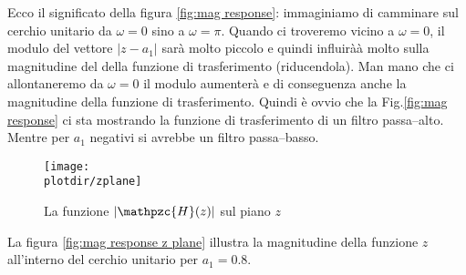 Ecco il significato della figura \ref{fig:mag response}: immaginiamo di
camminare sul cerchio unitario da $\omega = 0$ sino a $\omega = \pi$.
Quando ci troveremo vicino a $\omega = 0$, il modulo del vettore $|z - a_1|$
sar\`a molto piccolo e quindi influir\`aà molto sulla magnitudine del 
della funzione di trasferimento (riducendola). Man mano che ci allontaneremo
da $\omega = 0$ il modulo aumenter\`a e di conseguenza anche la magnitudine
della funzione di trasferimento. Quindi \`e ovvio che la Fig.\vref{fig:mag
response} ci sta mostrando la funzione di trasferimento di un filtro
passa--alto. Mentre per $a_1$ negativi si avrebbe un filtro passa--basso.
\begin{figure}[htp]
\begin{center}
				\texttt{[image: \\plotdir/zplane]}
				\caption{La funzione $|\mathpzc{H}(z)|$ sul piano $z$\label{fig:mag response z plane}}
\end{center}
\end{figure}

La figura \vref{fig:mag response z plane} illustra la magnitudine della
funzione $z$ all'interno del cerchio unitario per $a_1 = 0.8$.


